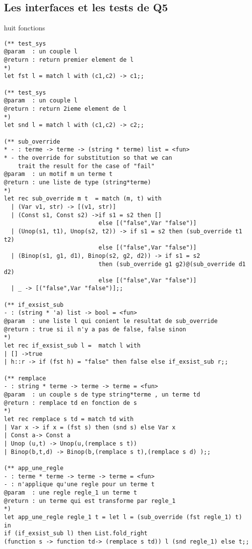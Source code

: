 \documentclass[12pt]{amsart}
\begin{document}
  \subsection{Les interfaces et les tests de Q5}   huit fonctions

\begin{lstlisting}
(** test_sys
@param  : un couple l
@return : return premier element de l 
*)
let fst l = match l with (c1,c2) -> c1;;

(** test_sys
@param  : un couple l
@return : return 2ieme element de l 
*)
let snd l = match l with (c1,c2) -> c2;;

(** sub_override 
* - : terme -> terme -> (string * terme) list = <fun>
* - the override for substitution so that we can 
    trait the result for the case of "fail" 
@param  : un motif m un terme t
@return : une liste de type (string*terme) 
*)
let rec sub_override m t  = match (m, t) with
  | (Var v1, str) -> [(v1, str)]
  | (Const s1, Const s2) ->if s1 = s2 then []
                           else [("false",Var "false")]
  | (Unop(s1, t1), Unop(s2, t2)) -> if s1 = s2 then (sub_override t1 t2) 
                           else [("false",Var "false")]
  | (Binop(s1, g1, d1), Binop(s2, g2, d2)) -> if s1 = s2 
                           then (sub_override g1 g2)@(sub_override d1 d2) 
                           else [("false",Var "false")]
  | _ -> [("false",Var "false")];;

(** if_exsist_sub
- : (string * 'a) list -> bool = <fun> 
@param  : une liste l qui conient le resultat de sub_override
@return : true si il n'y a pas de false, false sinon
*)
let rec if_exsist_sub l =  match l with
| [] ->true
| h::r -> if (fst h) = "false" then false else if_exsist_sub r;;  

(** remplace
- : string * terme -> terme -> terme = <fun>
@param  : un couple s de type string*terme , un terme td
@return : remplace td en fonction de s
*)
let rec remplace s td = match td with
| Var x -> if x = (fst s) then (snd s) else Var x
| Const a-> Const a 
| Unop (u,t) -> Unop(u,(remplace s t))
| Binop(b,t,d) -> Binop(b,(remplace s t),(remplace s d) );;

(** app_une_regle
- : terme * terme -> terme -> terme = <fun>
- : n'applique qu'une regle pour un terme t
@param  : une regle regle_1 un terme t
@return : un terme qui est transforme par regle_1
*)
let app_une_regle regle_1 t = let l = (sub_override (fst regle_1) t) in  
if (if_exsist_sub l) then List.fold_right
(function s -> function td-> (remplace s td)) l (snd regle_1) else t;;


\end{lstlisting}
\end{document}
